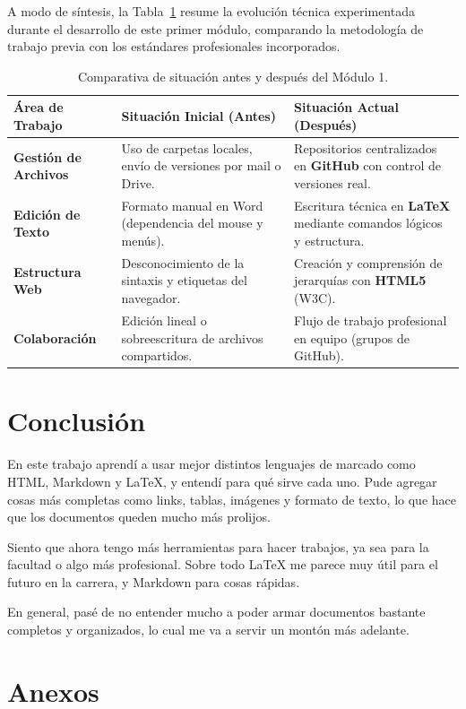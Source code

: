 \documentclass[runningheads]{llncs}
\begin{document}
A modo de síntesis, la Tabla~\ref{tab_comparativa} resume la evolución técnica experimentada durante el desarrollo de este primer módulo, comparando la metodología de trabajo previa con los estándares profesionales incorporados.

\begin{table}[h!]
\centering
\caption{Comparativa de situación antes y después del Módulo 1.}
\label{tab_comparativa}
\begin{tabular}{|l|p{4.5cm}|p{4.5cm}|}
\hline
\textbf{Área de Trabajo} & \textbf{Situación Inicial (Antes)} & \textbf{Situación Actual (Después)} \\ \hline
\textbf{Gestión de Archivos} & Uso de carpetas locales, envío de versiones por mail o Drive. & Repositorios centralizados en \textbf{GitHub} con control de versiones real. \\ \hline
\textbf{Edición de Texto} & Formato manual en Word (dependencia del mouse y menús). & Escritura técnica en \textbf{LaTeX} mediante comandos lógicos y estructura. \\ \hline
\textbf{Estructura Web} & Desconocimiento de la sintaxis y etiquetas del navegador. & Creación y comprensión de jerarquías con \textbf{HTML5} (W3C). \\ \hline
\textbf{Colaboración} & Edición lineal o sobreescritura de archivos compartidos. & Flujo de trabajo profesional en equipo (grupos de GitHub). \\ \hline
\end{tabular}
\end{table}

\section{Conclusión}
En este trabajo aprendí a usar mejor distintos lenguajes de marcado como HTML, Markdown y LaTeX, y entendí para qué sirve cada uno. Pude agregar cosas más completas como links, tablas, imágenes y formato de texto, lo que hace que los documentos queden mucho más prolijos.

Siento que ahora tengo más herramientas para hacer trabajos, ya sea para la facultad o algo más profesional. Sobre todo LaTeX me parece muy útil para el futuro en la carrera, y Markdown para cosas rápidas.

En general, pasé de no entender mucho a poder armar documentos bastante completos y organizados, lo cual me va a servir un montón más adelante.

\section{Anexos}
\end{document}
